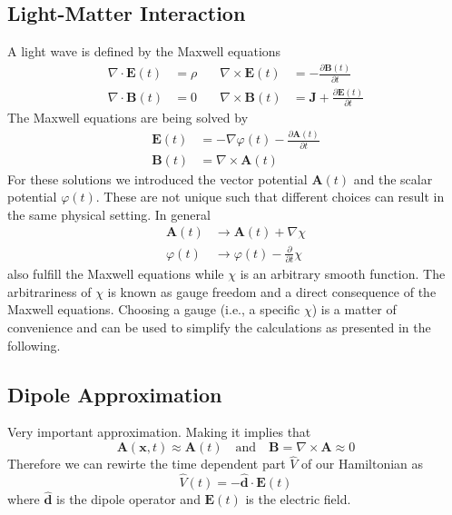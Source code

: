 \subsection{Light-Matter Interaction}
A light wave is defined by the Maxwell equations
\begin{equation*}
    \begin{aligned}
        \nabla \cdot \mathbf{E}(t) &= \rho \quad & \nabla \times \mathbf{E}(t) &= -\frac{\partial \mathbf{B}(t)}{\partial t} \\
        \nabla \cdot \mathbf{B}(t) &= 0 \quad & \nabla \times \mathbf{B}(t) &= \mathbf{J} + \frac{\partial \mathbf{E}(t)}{\partial t}
    \end{aligned}
\end{equation*}
The Maxwell equations are being solved by
\begin{equation*}
    \begin{aligned}
        \mathbf{E}(t) &= -\nabla \varphi(t) - \frac{\partial \mathbf{A}(t)}{\partial t}\\
        \mathbf{B}(t) &= \nabla \times \mathbf{A}(t)
    \end{aligned}
\end{equation*}
For these solutions we introduced the vector potential $\mathbf{A}(t)$ and the scalar potential $\varphi(t)$. 
These are not unique such that different choices can result in the same physical setting. In general
\begin{equation*}
    \begin{aligned}
        \mathbf{A}(t) &\to \mathbf{A}(t) + \nabla \chi \\
        \varphi(t) &\to \varphi(t) - \frac{\partial}{\partial t} \chi    
    \end{aligned}
\end{equation*}
also fulfill the Maxwell equations while $\chi$ is an arbitrary smooth function. The arbitrariness of $\chi$ is known as gauge freedom and a direct consequence of the Maxwell equations.
Choosing a gauge (i.e., a specific $\chi$) is a matter of convenience and can be used to simplify the calculations as presented in the following.




\subsection{Dipole Approximation}
Very important approximation. Making it implies that
\begin{equation}
    \mathbf{A}(\mathbf{x}, t) \approx \mathbf{A}(t) \quad \text{and} \quad \mathbf{B} = \nabla \times \mathbf{A} \approx 0
\end{equation}
Therefore we can rewirte the time dependent part $\hat{V}$ of our Hamiltonian as
\begin{equation}
    \hat{V}(t) = -\hat{\mathbf{d}} \cdot \mathbf{E}(t)
\end{equation}
where $\hat{\mathbf{d}}$ is the dipole operator and $\mathbf{E}(t)$ is the electric field.




